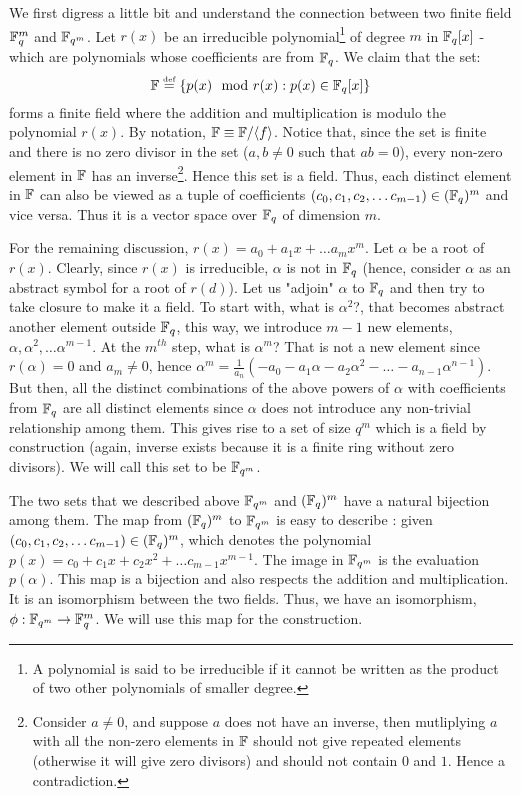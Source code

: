 We first digress a little bit and understand the connection between two finite field ${\mathbb{F}}_q^m$ and ${\mathbb{F}}_{q^m}$. Let $r(x)$ be an irreducible polynomial\footnote{A polynomial is said to be irreducible if it cannot be written as the product of two other polynomials of smaller degree.} of degree $m$ in ${\mathbb{F}}_q[x]$ - which are polynomials whose coefficients are from ${\mathbb{F}}_q$. We claim that the set:
$${\mathbb{F}} \stackrel{\text{\tiny def}}{=} \left\{ p(x)\mod r(x) : p(x) \in {\mathbb{F}}_q[x] \right\}$$
forms a finite field where the addition and multiplication is modulo the polynomial $r(x)$. By notation, ${\mathbb{F}} \equiv {\mathbb{F}}/\langle
f\rangle$. Notice that, since the set is finite and there is no zero divisor in the set ($a,b \ne 0$ such that $ab = 0$), every non-zero element in ${\mathbb{F}}$ has an inverse\footnote{Consider $a \ne 0$, and suppose $a$ does not have an inverse, then mutliplying $a$ with all the non-zero elements in ${\mathbb{F}}$ should not give repeated elements (otherwise it will give zero divisors) and should not contain $0$ and $1$. Hence a contradiction.}. Hence this set is a field. Thus, each distinct element in ${\mathbb{F}}$ can also be viewed as a tuple of coefficients $(c_0, c_1, c_2, \ldots c_{m-1}) \in ({\mathbb{F}}_q)^m$ and vice versa. Thus it is a vector space over ${\mathbb{F}}_q$ of dimension $m$.

For the remaining discussion, $r(x) = a_0 + a_1x+ \ldots a_mx^m$. Let $\alpha$ be a root of $r(x)$. Clearly, since $r(x)$ is irreducible, $\alpha$ is not in ${\mathbb{F}}_q$ (hence, consider $\alpha$ as an abstract symbol for a root of $r(d)$). Let us "adjoin" $\alpha$ to ${\mathbb{F}}_q$ and then try to take closure to make it a field. To start with, what is $\alpha^2$?, that becomes abstract another element outside ${\mathbb{F}}_q$, this way, we introduce $m-1$ new elements, $\alpha, \alpha^2, \ldots \alpha^{m-1}$. At the $m^{th}$ step, what is $\alpha^{m}$? That is not a new element since $r(\alpha) = 0$ and $a_m \ne 0$, hence $\alpha^m = \frac{1}{a_n}(-a_0-a_1\alpha-a_2\alpha^2-\ldots-a_{n-1}\alpha^{n-1})$. But then, all the distinct combinations of the above powers of $\alpha$ with coefficients from ${\mathbb{F}}_q$ are all distinct elements since $\alpha$ does not introduce any non-trivial relationship among them. This gives rise to a set of size $q^m$ which is a field by construction (again, inverse exists because it is a finite ring without zero divisors). We will call this set to be ${\mathbb{F}}_{q^m}$.

The two sets that we described above ${\mathbb{F}}_{q^m}$ and $({\mathbb{F}}_q)^m$ have a natural bijection among them. The map from $({\mathbb{F}}_q)^m$ to ${\mathbb{F}}_{q^m}$ is easy to describe : given $(c_0, c_1, c_2, \ldots c_{m-1}) \in ({\mathbb{F}}_q)^m$, which denotes the polynomial $p(x) = c_0+c_1x+c_2x^2+\ldots c_{m-1}x^{m-1}$. The image in ${\mathbb{F}}_{q^m}$ is the evaluation $p(\alpha)$. This map is a bijection and also respects the addition and multiplication. It is an isomorphism between the two fields. Thus, we have an isomorphism, $\phi : {\mathbb{F}}_{q^m} \to {\mathbb{F}}_q^m$. We will use this map for the construction.

